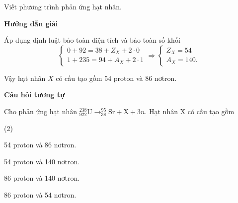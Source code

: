 \begin{dang}{Viết phương trình phản ứng hạt nhân.}
	
	{\begin{center}
			\textbf{Hướng dẫn giải}
		\end{center}
		Áp dụng định luật bảo toàn điện tích và bảo toàn số khối
		\begin{equation*}
			\left\{
			\begin{matrix}
				0+92=38+Z_X+2\cdot0\\
				1+235=94+A_X+2\cdot1
			\end{matrix}
			\right.
			\Rightarrow
			\left\{
			\begin{matrix}
				Z_X=54\\
				A_X=140.
			\end{matrix}
			\right.
		\end{equation*}
		
		Vậy hạt nhân $X$ có cấu tạo gồm 54 proton và 86 nơtron.
		
		\begin{center}
			\textbf{Câu hỏi tương tự}
		\end{center}
		
		Cho phản ứng hạt nhân $ ^{238}_{922} \text{U} \longrightarrow ^{95}_{38} \text{Sr} + \text{X} + 3n $. Hạt nhân X có cấu tạo gồm
		\begin{mcq}(2)
			\item 54 proton và 86 nơtron.
			\item 54 proton và 140 nơtron.
			\item 86 proton và 140 nơtron.
			\item 86 proton và 54 nơtron.
		\end{mcq}
		
}
\end{dang}
